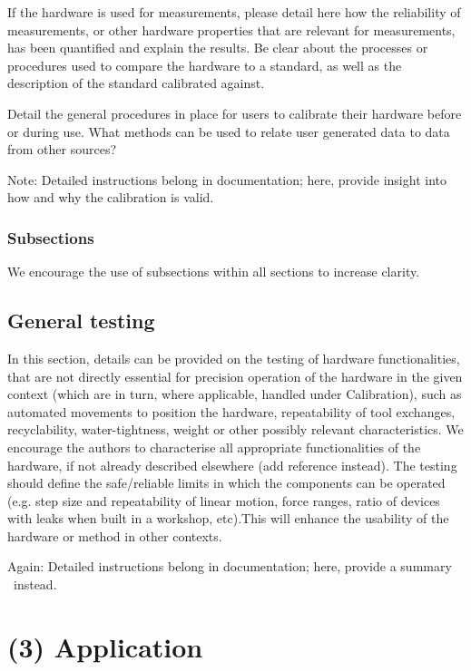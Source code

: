 \documentclass[a4paper]{article}
\begin{document}
If the hardware is used for measurements, please detail here how the
reliability of measurements, or other hardware properties that are
relevant for measurements, has been quantified and explain the
results. Be clear about the processes or procedures used to compare the
hardware to a standard, as well as the description of the standard
calibrated against.

Detail the general procedures in place for users to calibrate their
hardware before or during use. What methods can be used to relate user
generated data to data from other sources? 

Note: Detailed instructions belong in documentation; here, provide
insight into how and why the calibration is valid.


\subsubsection{Subsections}\label{h.6mrkl1u5j8xc}

We encourage the use of subsections within all sections to increase
clarity.


\subsection{General testing}\label{h.wbekh9ay82yu}

In this section, details can be provided on the testing of hardware
functionalities, that are not directly essential for precision
operation of the hardware in the given context (which are in turn,
where applicable, handled under Calibration), such as automated
movements to position the hardware, repeatability of tool exchanges,
recyclability, water-tightness, weight or other possibly relevant
characteristics. We encourage the authors to characterise all
appropriate functionalities of the hardware, if not already described
elsewhere (add reference instead). The testing should define the
safe/reliable limits in which the components can be operated (e.g. step
size and repeatability of linear motion, force ranges, ratio of devices
with leaks when built in a workshop, etc).This will enhance the
usability of the hardware or method in other contexts.

Again: Detailed instructions belong in documentation; here, provide a
summary ~instead.


\section{(3) Application}\label{h.f78bi3oom0mu}
\end{document}
